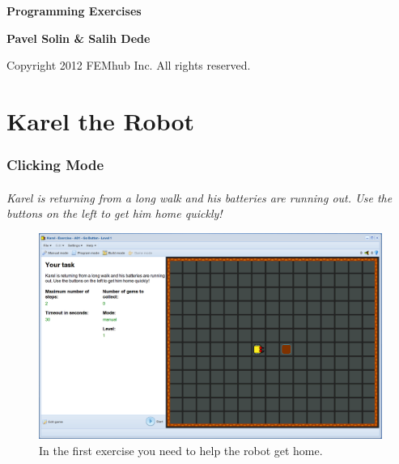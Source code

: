 \documentclass[article,A4,12pt]{llncs}
\newif\iffullversion
\begin{document}
\begin{center}
\vspace{2cm}
{\huge \bf Programming Exercises}
\end{center}
\vbox{}
\vspace{5mm}
\begin{center}
\iffullversion
\else
\centerline{\huge \color{red}{PREVIEW}}
\fi
\vspace{0.7cm}
{\large
{\bf Pavel Solin \& Salih Dede}
}
\end{center}
\vfill
\vfill
\begin{center}
Copyright 2012 FEMhub Inc. All rights reserved.
\end{center}
\newpage
\hbox{}
\newpage



\newpage
\setcounter{tocdepth}{2}
\tableofcontents

\newpage

\pagestyle{plain}
\setcounter{page}{1}


\part{Karel the Robot}

\setcounter{section}{2}
\section{Clicking Mode}

\subsection{}

{\em Karel is returning from a long walk and his batteries are running out. 
Use the buttons on the left to get him home quickly! }
\begin{figure}[!ht]
\begin{center}
\includegraphics[height=0.4\textwidth]{imgk/a01.png}
\end{center}
\vspace{-4mm}
\caption{In the first exercise you need to help the robot get home.}
\label{fig:a01}
\end{figure}
\end{document}
